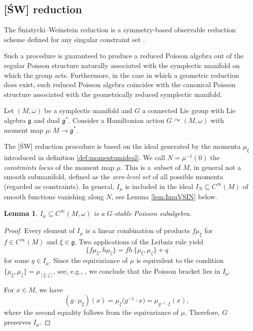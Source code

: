 \documentclass[pdftex]{sigma}
\numberwithin{equation}{section}
\newtheorem{Lemma}[Theorem]{Lemma}
\DeclareMathOperator{\action}{\curvearrowright}
\renewcommand{\subset}{\subseteq}
\begin{document}
\subsection{{[\'SW]} reduction}%

The \'Sniatycki--Weinstein reduction is a symmetry-based observable reduction scheme defined for any singular constraint set \cite{SniatyckiWeinstein83}.

Such a procedure is guaranteed to produce a reduced Poisson algebra out of the regular Poisson structure naturally associated with the symplectic manifold on which the group acts.
Furthermore, in the case in which a geometric reduction does exist, such reduced Poisson algebra coincides with the canonical Poisson structure associated with the geometrically reduced symplectic manifold.

Let $(M,\omega)$ be a symplectic manifold and $G$ a connected Lie group with Lie algebra $\mathfrak{g}$ and dual $\mathfrak{g}^*$.
Consider a Hamiltonian action $G\action (M,\omega)$ with moment map $\mu\colon M\to \mathfrak{g}^*$.

The [\'SW] reduction procedure is based on the ideal generated by the momenta $\mu_\xi$ introduced in definition \ref{def:momentumideal}.
	We call $N= \mu^{-1}(0)$ the \emph{constraints locus} of the moment map $\mu$.
	This is a~subset of $M$, in general not a smooth submanifold, defined as the \emph{zero-level set} of all possible momenta (regarded as constraints).
	In general, $I_\mu$ is included in the ideal $I_N\subset C^\infty(M)$ of smooth functions vanishing along $N$, see Lemma \ref{lem:ImuVSIN} below.


\begin{Lemma}\label{lem:ImuPoisson}
	$I_\mu\subset C^\infty(M,\omega)$ is a $G$-stable Poisson subalgebra.
\end{Lemma}

\begin{proof}
	Every element of $I_{\mu}$ is a linear combination of products $f \mu_\xi$ for $f \in C^\infty(M)$ and $\xi \in \mathfrak{g}$. Two applications of the Leibniz rule yield
	\[
		\{f \mu_\xi, h \mu_\zeta\} = fh\, \{ \mu_\xi,\mu_\zeta \} + q
	\]
	for some $q\in I_{\mu}$.
	Since the equivariance of $\mu$ is equivalent to the condition $\{\mu_\xi,\mu_\zeta\}=\mu_{[\xi,\zeta]}$, see, e.g., \cite[Section~22.1]{CannasdaSilva01}, we conclude that the Poisson bracket lies in $I_{\mu}$.

	For $x\in M$, we have
	\[
		( g \cdot \mu_\xi )(x) =
		\mu_\xi\bigl(g^{-1}\cdot x\bigr)
		= \mu_{g^{-1}\cdot\xi}(x),
	\]
	where the second equality follows from the equivariance of $\mu$.
	Therefore, $G$ preserves $I_{\mu}$.
\end{proof}
\end{document}
